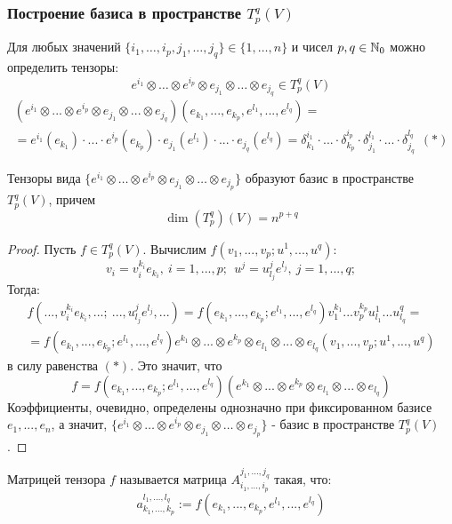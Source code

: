 \subsubsection*{Построение базиса в пространстве $T_p^q(V)$}
Для любых значений $\{i_1,\dots ,i_p,j_1,\dots,j_q\}\in \{1,\dots,n\}$ и чисел $p,q \in \mathbb{N}_0$ можно определить тензоры:
\[e^{i_1}\otimes \dots \otimes e^{i_p}\otimes e_{j_1}\otimes \dots\otimes e_{j_q}\in T_p^q(V)\]
\begin{multline*}
    (e^{i_1}\otimes ... \otimes e^{i_p}\otimes e_{j_1}\otimes ... \otimes e_{j_q})(e_{k_1}, ... ,e_{k_p},e^{l_1},...,e^{l_q})=\\
    =e^{i_1}(e_{k_1})\cdot ... \cdot e^{i_p}(e_{k_p})\cdot e_{j_1}(e^{l_1})\cdot ... \cdot e_{j_q}(e^{l_q}) = \delta_{k_1}^{i_1}\cdot ... \cdot \delta_{k_p}^{i_p} \cdot \delta_{j_1}^{l_1}\cdot ... \cdot \delta_{j_q}^{l_q} \ \ (*)
\end{multline*} 
\begin{theorem}
    Тензоры вида $\{e^{i_1}\otimes \dots \otimes e^{i_p}\otimes e_{j_1}\otimes \dots\otimes e_{j_p}\}$ образуют базис в пространстве $T_p^q(V)$, причем
    \[\dim{(T_p^q)}(V)=n^{p+q}\]
\end{theorem}
\begin{proof}
    Пусть $f \in T_p^q(V)$. Вычислим $f(v_1,...,v_p; u^1,...,u^q)$:
    \[v_i = v_i^{k_i}e_{k_i}, \ i = 1,...,p; \ \  u^j = u_{l_j}^j e^{l_j}, \ j = 1,...,q;\]
    Тогда:
    \begin{multline*}
        f(...,v_i^{k_i}e_{k_i},...; \ ...,u_{l_j}^j e^{l_j},...) = f(e_{k_1},...,e_{k_p}; e^{l_1},...,e^{l_q})v_1^{k_1}...v_p^{k_p}u_{l_1}^1...u_{l_q}^q =\\= f(e_{k_1},...,e_{k_p}; e^{l_1},...,e^{l_q}) e^{k_1}\otimes...\otimes e^{k_p}\otimes e_{l_1}\otimes...\otimes  e_{l_q} (v_1,...,v_p; u^1,...,u^q) 
    \end{multline*}
    в силу равенства $(*)$. Это значит, что
    \[f = f(e_{k_1},...,e_{k_p}; e^{l_1},...,e^{l_q})(e^{k_1}\otimes...\otimes e^{k_p}\otimes e_{l_1}\otimes...\otimes e_{l_q})\]
    Коэффициенты, очевидно, определены однозначно при фиксированном базисе $e_1,...,e_n$, а значит, $\{e^{i_1}\otimes \dots \otimes e^{i_p}\otimes e_{j_1}\otimes \dots\otimes e_{j_p}\}$ - базис в пространстве $T_p^q(V)$.  
\end{proof}
\begin{definition}
    Матрицей тензора $f$ называется матрица $A_{i_1,...,i_p}^{j_1,...,j_q}$ такая, что:
    $$a_{k_1,...,k_p}^{l_1,...,l_q} := f(e_{k_1},...,e_{k_p}, e^{l_1},...,e^{l_q})$$
\end{definition}
